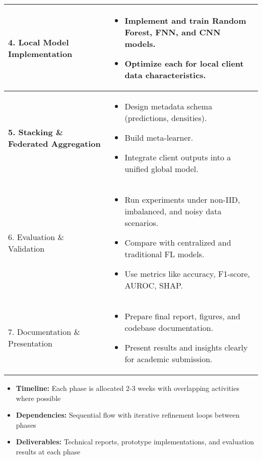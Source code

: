 \begin{table}[htbp]
\begin{tabular}{|>{\bfseries}l!{\vrule width 1.2pt}p{9.5cm}|}
4. Local Model Implementation & 
\vspace{-4mm}\begin{itemize}[leftmargin=*,nosep]
\item Implement and train Random Forest, FNN, and CNN models.
\item Optimize each for local client data characteristics.
\end{itemize} \\ \hline

5. Stacking \& Federated Aggregation & 
\vspace{-4mm}\begin{itemize}[leftmargin=*,nosep]
\item Design metadata schema (predictions, densities).
\item Build meta-learner.
\item Integrate client outputs into a unified global model.
\end{itemize} \\ \hline

6. Evaluation \& Validation & 
\vspace{-4mm}\begin{itemize}[leftmargin=*,nosep]
\item Run experiments under non-IID, imbalanced, and noisy data scenarios.
\item Compare with centralized and traditional FL models.
\item Use metrics like accuracy, F1-score, AUROC, SHAP.
\end{itemize} \\ \hline

7. Documentation \& Presentation & 
\vspace{-4mm}\begin{itemize}[leftmargin=*,nosep]
\item Prepare final report, figures, and codebase documentation.
\item Present results and insights clearly for academic submission.
\end{itemize} \\ \hline
\end{tabular}
\end{table}

\begin{itemize}[leftmargin=*]
\item \textbf{Timeline:} Each phase is allocated 2-3 weeks with overlapping activities where possible
\item \textbf{Dependencies:} Sequential flow with iterative refinement loops between phases
\item \textbf{Deliverables:} Technical reports, prototype implementations, and evaluation results at each phase
\end{itemize}


